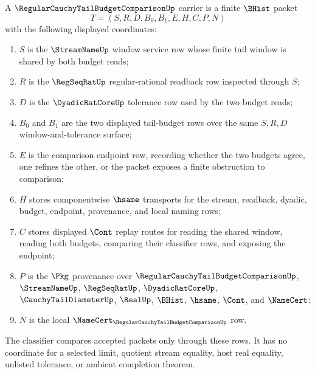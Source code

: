\begin{definition}
\label{def:regular-cauchy-tail-budget-comparison-carrier}
A $\RegularCauchyTailBudgetComparisonUp$ carrier is a finite $\BHist$ packet
$$
T=(S,R,D,B_0,B_1,E,H,C,P,N)
$$
with the following displayed coordinates:
\begin{enumerate}
\item $S$ is the $\StreamNameUp$ window service row whose finite tail window is shared by both budget reads;
\item $R$ is the $\RegSeqRatUp$ regular-rational readback row inspected through $S$;
\item $D$ is the $\DyadicRatCoreUp$ tolerance row used by the two budget reads;
\item $B_0$ and $B_1$ are the two displayed tail-budget rows over the same $S,R,D$ window-and-tolerance surface;
\item $E$ is the comparison endpoint row, recording whether the two budgets agree, one refines the other, or the packet exposes a finite obstruction to comparison;
\item $H$ stores componentwise $\hsame$ transports for the stream, readback, dyadic, budget, endpoint, provenance, and local naming rows;
\item $C$ stores displayed $\Cont$ replay routes for reading the shared window, reading both budgets, comparing their classifier rows, and exposing the endpoint;
\item $P$ is the $\Pkg$ provenance over $\RegularCauchyTailBudgetComparisonUp$, $\StreamNameUp$, $\RegSeqRatUp$, $\DyadicRatCoreUp$, $\CauchyTailDiameterUp$, $\RealUp$, $\BHist$, $\hsame$, $\Cont$, and $\NameCert$;
\item $N$ is the local $\NameCert_{\RegularCauchyTailBudgetComparisonUp}$ row.
\end{enumerate}
The classifier compares accepted packets only through these rows. It has no coordinate for a selected limit, quotient stream equality, host real equality, unlisted tolerance, or ambient completion theorem.
\end{definition}

